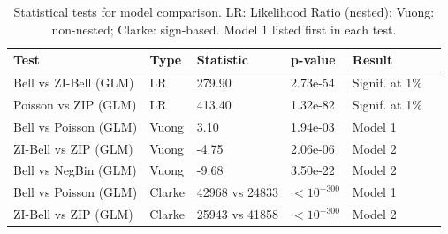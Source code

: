 \begin{table}
\caption{Statistical tests for model comparison. LR: Likelihood Ratio (nested); Vuong: non-nested; Clarke: sign-based. Model 1 listed first in each test.}
\label{tab:stat_tests}
\begin{tabular}{llllll}
\toprule
Test & Type & Statistic & p-value & Result \\
\midrule
Bell vs ZI-Bell (GLM) & LR & 279.90 & 2.73e-54 & Signif. at 1\% \\
Poisson vs ZIP (GLM) & LR & 413.40 & 1.32e-82 & Signif. at 1\% \\
Bell vs Poisson (GLM) & Vuong & 3.10 & 1.94e-03 & Model 1 \\
ZI-Bell vs ZIP (GLM) & Vuong & -4.75 & 2.06e-06 & Model 2 \\
Bell vs NegBin (GLM) & Vuong & -9.68 & 3.50e-22 & Model 2 \\
Bell vs Poisson (GLM) & Clarke & 42968 vs 24833 & $< 10^{-300}$ & Model 1 \\
ZI-Bell vs ZIP (GLM) & Clarke & 25943 vs 41858 & $< 10^{-300}$ & Model 2 \\
\bottomrule
\end{tabular}
\end{table}
